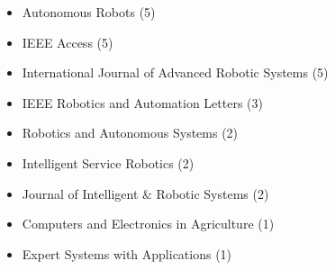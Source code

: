 \begin{itemize}
	\item Autonomous Robots (5)
	\item IEEE Access (5)
	\item International Journal of Advanced Robotic Systems (5)
	\item IEEE Robotics and Automation Letters (3)
	\item Robotics and Autonomous Systems (2)	
	\item Intelligent Service Robotics (2)
	\item Journal of Intelligent \& Robotic Systems (2)
	\item Computers and Electronics in Agriculture (1)
	\item Expert Systems with Applications (1)
\end{itemize}